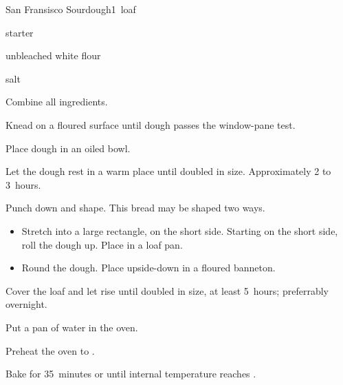 \begin{recipe}{San Fransisco Sourdough}{}{1~loaf}

\begin{ingredients}
\item {} starter
\item {} unbleached white flour
\item {} salt
\end{ingredients}

\begin{directions}
\item Combine all ingredients.
\item Knead on a floured surface until dough passes the window-pane test.
\item Place dough in an oiled bowl.
\item Let the dough rest in a warm place until doubled in size. Approximately 2 to 3~hours.
\item Punch down and shape.
This bread may be shaped two ways.
\begin{itemize}
\item Stretch into a large rectangle,  on the short side. Starting on the short side, roll the dough up. Place in a loaf pan.
\item Round the dough. Place upside-down in a floured banneton.
\end{itemize}
\item Cover the loaf and let rise until doubled in size, at least 5~hours; preferrably overnight.
\item Put a pan of water in the oven.
\item Preheat the oven to .
\item Bake for 35~minutes or until internal temperature reaches .
\end{directions}
\end{recipe}
